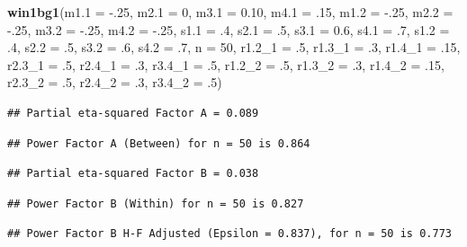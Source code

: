 \documentclass[
]{book}
\newenvironment{Shaded}{\begin{snugshade}}{\end{snugshade}}
\newcommand{\DataTypeTok}[1]{\textcolor[rgb]{0.13,0.29,0.53}{#1}}
\newcommand{\DecValTok}[1]{\textcolor[rgb]{0.00,0.00,0.81}{#1}}
\newcommand{\FloatTok}[1]{\textcolor[rgb]{0.00,0.00,0.81}{#1}}
\newcommand{\KeywordTok}[1]{\textcolor[rgb]{0.13,0.29,0.53}{\textbf{#1}}}
\newcommand{\NormalTok}[1]{#1}
\begin{document}
\begin{Shaded}
\begin{Highlighting}[]
\KeywordTok{win1bg1}\NormalTok{(}\DataTypeTok{m1.1 =} \FloatTok{-.25}\NormalTok{, }\DataTypeTok{m2.1 =} \DecValTok{0}\NormalTok{, }\DataTypeTok{m3.1 =} \FloatTok{0.10}\NormalTok{, }\DataTypeTok{m4.1 =} \FloatTok{.15}\NormalTok{, }
        \DataTypeTok{m1.2 =} \FloatTok{-.25}\NormalTok{, }\DataTypeTok{m2.2 =} \FloatTok{-.25}\NormalTok{, }\DataTypeTok{m3.2 =} \FloatTok{-.25}\NormalTok{, }\DataTypeTok{m4.2 =} \FloatTok{-.25}\NormalTok{, }
        \DataTypeTok{s1.1 =} \FloatTok{.4}\NormalTok{, }\DataTypeTok{s2.1 =} \FloatTok{.5}\NormalTok{, }\DataTypeTok{s3.1 =} \FloatTok{0.6}\NormalTok{, }\DataTypeTok{s4.1 =} \FloatTok{.7}\NormalTok{, }\DataTypeTok{s1.2 =} \FloatTok{.4}\NormalTok{, }
        \DataTypeTok{s2.2 =} \FloatTok{.5}\NormalTok{, }\DataTypeTok{s3.2 =} \FloatTok{.6}\NormalTok{, }\DataTypeTok{s4.2 =} \FloatTok{.7}\NormalTok{,}
        \DataTypeTok{n =} \DecValTok{50}\NormalTok{, }
        \DataTypeTok{r1.2_1 =} \FloatTok{.5}\NormalTok{, }\DataTypeTok{r1.3_1 =} \FloatTok{.3}\NormalTok{, }\DataTypeTok{r1.4_1 =} \FloatTok{.15}\NormalTok{, }
        \DataTypeTok{r2.3_1 =} \FloatTok{.5}\NormalTok{, }\DataTypeTok{r2.4_1 =} \FloatTok{.3}\NormalTok{, }\DataTypeTok{r3.4_1 =} \FloatTok{.5}\NormalTok{, }
        \DataTypeTok{r1.2_2 =} \FloatTok{.5}\NormalTok{, }\DataTypeTok{r1.3_2 =} \FloatTok{.3}\NormalTok{, }\DataTypeTok{r1.4_2 =} \FloatTok{.15}\NormalTok{, }
        \DataTypeTok{r2.3_2 =} \FloatTok{.5}\NormalTok{, }\DataTypeTok{r2.4_2 =} \FloatTok{.3}\NormalTok{, }\DataTypeTok{r3.4_2 =} \FloatTok{.5}\NormalTok{)}
\end{Highlighting}
\end{Shaded}

\begin{verbatim}
## Partial eta-squared Factor A = 0.089
\end{verbatim}

\begin{verbatim}
## Power Factor A (Between) for n = 50 is 0.864
\end{verbatim}

\begin{verbatim}
## Partial eta-squared Factor B = 0.038
\end{verbatim}

\begin{verbatim}
## Power Factor B (Within) for n = 50 is 0.827
\end{verbatim}

\begin{verbatim}
## Power Factor B H-F Adjusted (Epsilon = 0.837), for n = 50 is 0.773
\end{verbatim}
\end{document}
